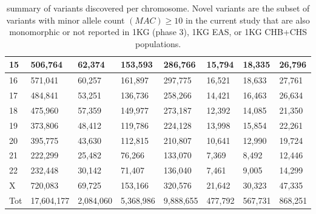 \begin{table}[!ht]
\begin{tabular}{|l|l|l|l|l|l|l|l|}
        15 & 506,764 & 62,374 & 153,593 & 286,766 & 15,794 & 18,335 & 26,796 \\ \hline
        16 & 571,041 & 60,257 & 161,897 & 297,775 & 16,521 & 18,633 & 27,761 \\ \hline
        17 & 484,841 & 53,251 & 136,736 & 258,266 & 14,421 & 16,463 & 26,634 \\ \hline
        18 & 475,960 & 57,359 & 149,977 & 273,187 & 12,392 & 14,085 & 21,350 \\ \hline
         19 & 373,806 & 48,412 & 119,786 & 224,128 & 13,998 & 15,854 & 22,261 \\ \hline
        20 & 395,775 & 43,630 & 112,815 & 210,807 & 10,641 & 12,990 & 19,724 \\ \hline
        21 & 222,299 & 25,482 & 76,266 & 133,070 & 7,369 & 8,492 & 12,446 \\ \hline
        22 & 232,448 & 30,142 & 71,407 & 136,040 & 7,461 & 9,005 & 14,299 \\ \hline
        X & 720,083 & 69,725 & 153,166 & 320,576 & 21,642 & 30,323 & 47,335 \\ \hline
        Tot & 17,604,177 & 2,084,060 & 5,368,986 & 9,888,655 & 477,792 & 567,731 & 868,251 \\ \hline
    \end{tabular}
    \caption{summary of variants discovered per chromosome. Novel variants are the subset of variants with minor allele count $(MAC) \ge 10$ in the current study that are also monomorphic or not reported in 1KG (phase 3), 1KG EAS, or 1KG CHB+CHS populations.}
\label{table:2.3}
\end{table}
